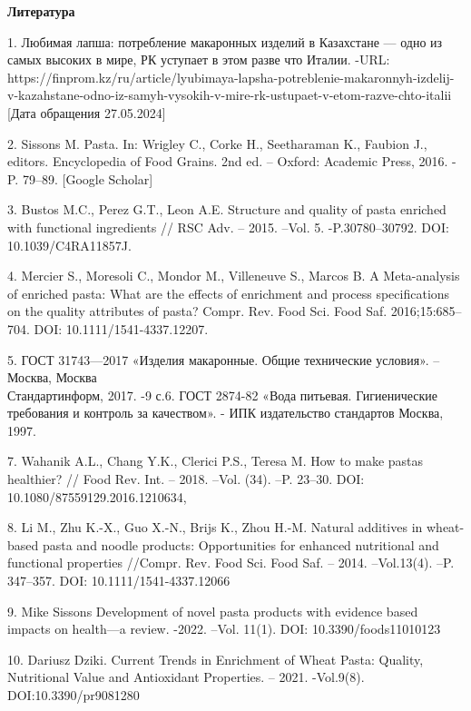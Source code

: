 \begin{center}
  {\bfseries Литература}
  \end{center}

\begin{noparindent}

1. Любимая лапша: потребление макаронных изделий в Казахстане --- одно
из самых высоких в мире, РК уступает в этом разве что Италии. -URL:
https://finprom.kz/ru/article/lyubimaya-lapsha-potreblenie-makaronnyh-izdelij-v-kazahstane-odno-iz-samyh-vysokih-v-mire-rk-ustupaet-v-etom-razve-chto-italii
\\{[}Дата обращения 27.05.2024{]}

2. Sissons M. Pasta. In: Wrigley C., Corke H., Seetharaman K., Faubion
J., editors. Encyclopedia of Food Grains. 2nd ed. -- Oxford: Academic
Press, 2016. - P. 79--89. {[}Google Scholar{]}

3. Bustos M.C., Perez G.T., Leon A.E. Structure and quality of pasta
enriched with functional ingredients // RSC Adv. -- 2015. --Vol. 5.
-P.30780--30792. DOI: 10.1039/C4RA11857J.

4. Mercier S., Moresoli C., Mondor M., Villeneuve S., Marcos B. A
Meta-analysis of enriched pasta: What are the effects of enrichment and
process specifications on the quality attributes of pasta? Compr. Rev.
Food Sci. Food Saf. 2016;15:685--704. DOI: 10.1111/1541-4337.12207.

5. ГОСТ 31743---2017 «Изделия макаронные. Общие технические условия».
--Москва, Москва \\Стандартинформ, 2017. -9 с.6. ГОСТ 2874-82 «Вода
питьевая. Гигиенические требования и контроль за качеством». - ИПК
издательство стандартов Москва, 1997.

7. Wahanik A.L., Chang Y.K., Clerici P.S., Teresa M. How to make pastas
healthier? // Food Rev. Int. -- 2018. --Vol. (34). --P. 23--30. DOI:
10.1080/87559129.2016.1210634,

8. Li M., Zhu K.-X., Guo X.-N., Brijs K., Zhou H.-M. Natural additives
in wheat-based pasta and noodle products: Opportunities for enhanced
nutritional and functional properties //Compr. Rev. Food Sci. Food Saf.
-- 2014. --Vol.13(4). --P. 347--357. DOI: 10.1111/1541-4337.12066

9. Mike Sissons Development of novel pasta products with evidence based
impacts on health---a review. -2022. --Vol. 11(1). DOI:
10.3390/foods11010123

10. Dariusz Dziki. Current Trends in Enrichment of Wheat Pasta: Quality,
Nutritional Value and Antioxidant Properties. -- 2021. -Vol.9(8).
DOI:10.3390/pr9081280


\end{noparindent}
